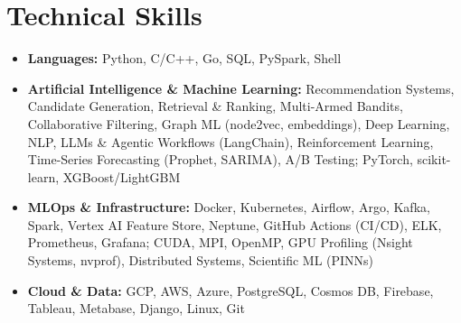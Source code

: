 \documentclass[letterpaper, 11pt]{article}
\begin{document}
\section{Technical Skills}
\begin{itemize}[leftmargin=0pt, label={}]
  \item{\textbf{Languages:} Python, C/C++, Go, SQL, PySpark, Shell}
  \item{\textbf{Artificial Intelligence \& Machine Learning:} Recommendation Systems, Candidate Generation, Retrieval \& Ranking, Multi-Armed Bandits, Collaborative Filtering, Graph ML (node2vec, embeddings), Deep Learning, NLP, LLMs \& Agentic Workflows (LangChain), Reinforcement Learning, Time-Series Forecasting (Prophet, SARIMA), A/B Testing; PyTorch, scikit-learn, XGBoost/LightGBM}
  \item{\textbf{MLOps \& Infrastructure:} Docker, Kubernetes, Airflow, Argo, Kafka, Spark, Vertex AI Feature Store, Neptune, GitHub Actions (CI/CD), ELK, Prometheus, Grafana; CUDA, MPI, OpenMP, GPU Profiling (Nsight Systems, nvprof), Distributed Systems, Scientific ML (PINNs)}
  \item{\textbf{Cloud \& Data:} GCP, AWS, Azure, PostgreSQL, Cosmos DB, Firebase, Tableau, Metabase, Django, Linux, Git}
\end{itemize}
\end{document}
